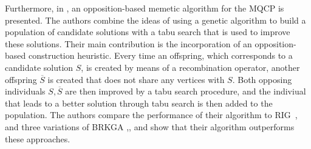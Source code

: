 \documentclass[draft,final]{vutinfth} %
\begin{document}
Furthermore, in \cite{zhou_opposition-based_2020}, an opposition-based memetic algorithm for the MQCP is presented. The authors combine the ideas of using a genetic algorithm to build a population of candidate solutions with a tabu search that is used to improve these solutions. Their main contribution is the incorporation of an opposition-based construction heuristic. Every time an offspring, which corresponds to a candidate solution $S$, is created by means of a recombination operator, another offspring $\overline{S}$ is created that does not share any vertices with $S$. Both opposing individuals $S, \overline{S}$ are then improved by a tabu search procedure, and the indiviual that leads to a better solution through tabu search is then added to the population. The authors compare the performance of their algorithm to RIG~\cite{oliveira2013construction}, and three variations of BRKGA \cite{pinto2015biased},\cite{pinto_biased_2018}, \cite{pinto2021brkga} and show that their algorithm outperforms these approaches.
\end{document}
